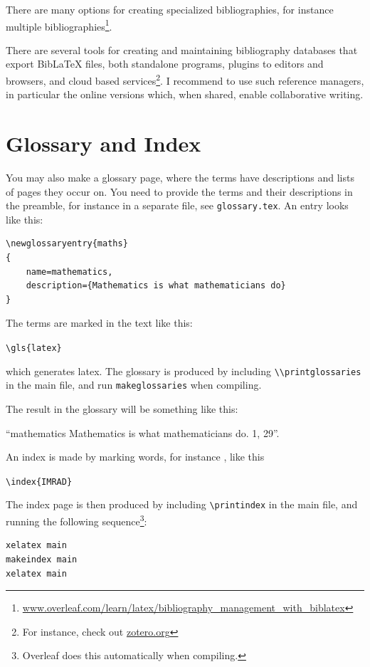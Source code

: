 There are many options for creating specialized bibliographies, for instance multiple bibliographies\footnote{\url{www.overleaf.com/learn/latex/bibliography_management_with_biblatex}}.

There are several tools for creating and maintaining bibliography databases that export BibLaTeX files, both standalone programs, plugins to editors and browsers, and cloud based services\footnote{For instance, check out \url{zotero.org}}. I recommend to use such reference managers, in particular the online versions which, when shared, enable collaborative writing.

\section{Glossary and Index}

You may also make a glossary page, where the terms have descriptions and lists of pages they occur on. You need to provide the terms and their descriptions in the preamble, for instance in a separate file, see \verb|glossary.tex|. An entry looks like this:

\begin{lstlisting}[float,float=!htbp]
\newglossaryentry{maths}
{
    name=mathematics,
    description={Mathematics is what mathematicians do}
}
\end{lstlisting}

The terms are marked in the text like this:

\verb|\gls{latex}|

which generates
\gls{latex}. The glossary is produced by including \verb|\\printglossaries| in the main file, and run \verb|makeglossaries| when compiling. 

The result in the glossary will be something like this:  

``mathematics Mathematics is what mathematicians do. 1, 29''.

An index is made by marking words, for instance , like this

\verb|\index{IMRAD}|

The index page is then produced by including \verb|\printindex| in the main file, and running the following sequence\footnote{Overleaf does this automatically when compiling.}:

\begin{lstlisting}[float,float=!htbp]
xelatex main
makeindex main
xelatex main
\end{lstlisting}


